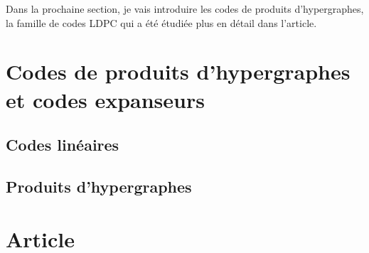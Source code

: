 Dans la prochaine section,
je vais introduire les codes de produits d'hypergraphes, 
la famille de codes LDPC qui a été étudiée plus en détail dans l'article.

\section{Codes de produits d'hypergraphes et codes expanseurs}
\subsection{Codes linéaires}
\subsection{Produits d'hypergraphes}


\section{Article}



